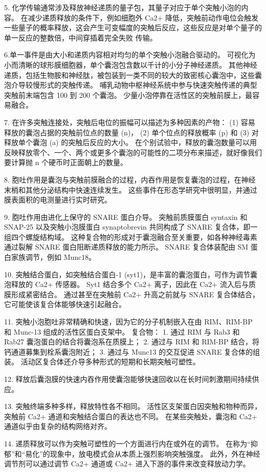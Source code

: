 5. 化学传输通常涉及释放神经递质的量子包，其量子对应于单个突触小泡的内容。
在减少递质释放的条件下，例如细胞外 Ca2+ 降低，突触前动作电位会触发一些量子的概率释放，这会产生可变幅度的突触后反应，这些反应是对单个量子的单一反应的整数倍，中间穿插着完全失败 传输。


6.单一事件是由大小和递质内容相对均匀的单个突触小泡融合驱动的。
可视化为小而清晰的球形膜细胞器，单个囊泡包含数以千计的小分子神经递质。
其他神经递质，包括生物胺和神经肽，被包装到一类不同的较大的致密核心囊泡中，这些囊泡介导较慢形式的突触传递。
哺乳动物中枢神经系统中参与快速突触传递的典型突触前末端包含 100 到 200 个囊泡。
少量小泡停靠在活性区的突触前膜上，最容易融合。


7. 在许多突触连接处，突触后电位的振幅可以描述为多种因素的产物：
(1) 容易释放的囊泡占据的突触前位点的数量 (n)，
(2) 单个位点的释放概率 (p) 和
(3) 对释放单个囊泡 (a) 的突触后反应的大小。
在个别试验中，释放的囊泡数量可以用反映释放零个、一个、两个或更多个囊泡的可能性的二项分布来描述，就好像我们要计算抛 n 个硬币时正面朝上的数量。 


8. 胞吐作用是囊泡与突触前膜融合的过程，内吞作用是恢复囊泡的过程，在神经末梢和其他分泌结构中快速连续发生。
这些事件在形态学研究中很明显，并通过膜表面积的电测量进行实时研究。 


9. 胞吐作用由进化上保守的 SNARE 蛋白介导。
突触前质膜蛋白 syntaxin 和 SNAP-25 以及突触小泡膜蛋白 synaptobrevin 共同构成了 SNARE 复合体，即一组四个螺旋结构域。
这种复合物的形成对于囊泡融合至关重要，如各种神经毒素通过裂解 SNARE 蛋白阻断递质释放的能力所示。
SNARE 复合体装配由 SM 蛋白家族调节，例如 Munc18。 


10. 突触结合蛋白，如突触结合蛋白-1 (syt1)，是丰富的囊泡蛋白，可作为调节囊泡释放的 Ca2+ 传感器。
Syt1 结合多个 Ca2+ 离子，因此在 Ca2+ 流入后与质膜形成紧密结合。
通过甚至在突触前 Ca2+ 升高之前就与 SNARE 复合体结合，它可能使该复合体能够快速引起融合。


11. 突触小泡胞吐非常精确和快速，因为它的分子机制嵌入在由 RIM、RIM-BP 和 Munc-13 组成的活性区蛋白支架中。
复合物：
1. 通过 RIM 与 Rab3 和 Rab27 囊泡蛋白的结合将囊泡系在质膜上；
2. 通过与 RIM 和 RIM-BP 结合，将钙通道募集到栓系囊泡附近；
3. 通过与 Munc13 的交互促进 SNARE 复合体的组装。
活动区复合体还介导多种形式的短期和长期突触可塑性。 


12. 释放后囊泡膜的快速内吞作用使囊泡能够快速回收以在长时间刺激期间持续供应。


13. 突触终端多种多样，释放特性各不相同。
活性区支架蛋白因突触和物种而异，突触前 Ca2+ 通道和突触结合蛋白的表达也不同。
在某些突触处，囊泡和 Ca2+ 通道似乎由复杂的结构网络对齐。 


14. 递质释放可以作为突触可塑性的一个方面进行内在或外在的调节。
在称为“抑郁”和“易化”的现象中，放电模式会从本质上强烈影响突触强度。
此外，外在神经调节剂可以通过调节 Ca2+ 通道或 Ca2+ 进入下游的事件来改变释放动力学。




